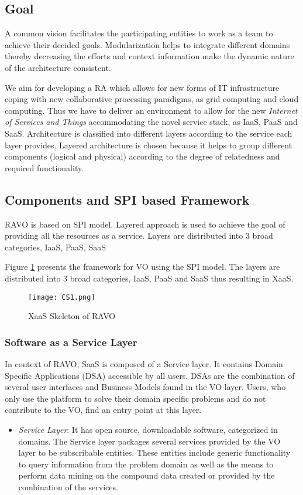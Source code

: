 \documentclass[]{article}
\begin{document}
\subsection{Goal}
A common vision facilitates the participating entities to work as a team to achieve their decided goals. Modularization helps to integrate different domains thereby decreasing the efforts and context information make the dynamic nature of the architecture consistent.

We aim for developing a RA which allows for new forms of IT infrastructure coping with new collaborative processing paradigms, as grid computing and cloud computing. Thus we have to deliver an environment to allow for the new \emph{Internet of Services and Things} accommodating the novel service stack, as IaaS, PaaS and SaaS.
Architecture is classified into different layers according to the service each layer provides. Layered architecture is chosen because it helps to group different components (logical and physical) according to the degree of relatedness and required functionality.

\subsection{Components and SPI based Framework}
RAVO is based on SPI model. Layered approach is used to achieve the goal of providing all the resources as a service. Layers are distributed into 3 broad categories, IaaS, PaaS, SaaS





Figure \ref{Fig:CSVO} presents the framework for VO using the SPI model. The layers are distributed into 3 broad categories, IaaS, PaaS and SaaS thus resulting in XaaS.
\begin{figure}
\begin{center}
  \texttt{[image: CS1.png]}
  \caption{XaaS Skeleton of RAVO}
  \label{Fig:CSVO}
  \end{center}
   \end{figure}



\subsubsection{\large{Software as a Service Layer}}


In context of RAVO, SaaS is composed of a Service layer. It contains Domain Specific Applications (DSA) accessible by all users. DSAs are the combination of several user interfaces and Business Models found in the VO layer. Users, who only use the platform to solve their domain specific problems and do not contribute to the VO, find an entry point at this layer.
\begin{itemize}
\item
\emph{Service Layer}: It has open source, downloadable software, categorized in domains. The Service layer packages several services provided by the VO layer to be subscribable entities. These entities include generic functionality to query information from the problem domain as well as the means to perform data mining on the compound data created or provided by the combination of the services.
\end{itemize}
\end{document}
